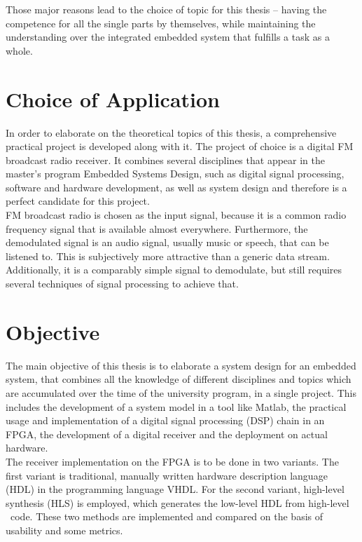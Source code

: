 Those major reasons lead to the choice of topic for this thesis -- having the competence for all the single parts by themselves, while maintaining the understanding over the integrated embedded system that fulfills a task as a whole.

\section{Choice of Application}

In order to elaborate on the theoretical topics of this thesis, a comprehensive practical project is developed along with it.
The project of choice is a digital FM broadcast radio receiver.
It combines several disciplines that appear in the master's program Embedded Systems Design, such as digital signal processing, software and hardware development, as well as system design and therefore is a perfect candidate for this project.\\

FM broadcast radio is chosen as the input signal, because it is a common radio frequency signal that is available almost everywhere.
Furthermore, the demodulated signal is an audio signal, usually music or speech, that can be listened to.
This is subjectively more attractive than a generic data stream.
Additionally, it is a comparably simple signal to demodulate, but still requires several techniques of signal processing to achieve that.

\section{Objective}

The main objective of this thesis is to elaborate a system design for an embedded system, that combines all the knowledge of different disciplines and topics which are accumulated over the time of the university program, in a single project.
This includes the development of a system model in a tool like Matlab, the practical usage and implementation of a digital signal processing (DSP) chain in an FPGA, the development of a digital receiver and the deployment on actual hardware.\\

The receiver implementation on the FPGA is to be done in two variants.
The first variant is traditional, manually written hardware description language (HDL) in the programming language VHDL.
For the second variant, high-level synthesis (HLS) is employed, which generates the low-level HDL from high-level \cplusplus\ code.
These two methods are implemented and compared on the basis of usability and some metrics.\\

